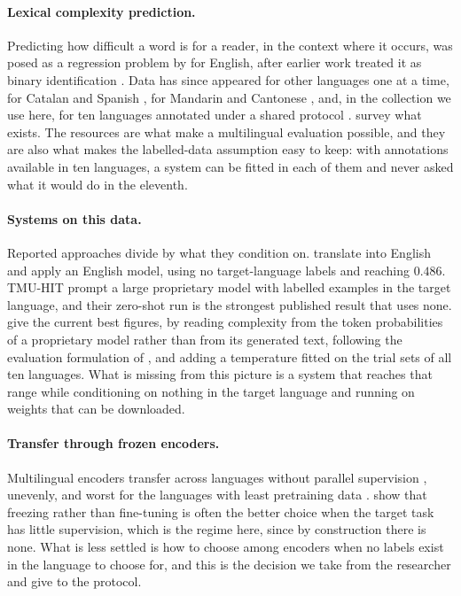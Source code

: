 \paragraph{Lexical complexity prediction.} Predicting how difficult a
word is for a reader, in the context where it occurs, was posed as a
regression problem by \citet{shardlow-etal-2021-semeval} for English,
after earlier work treated it as binary identification
\citep{yimam-etal-2018-report}. Data has since appeared for other
languages one at a time, for Catalan and Spanish
\citep{saggion-etal-2024-lexical}, for Mandarin and Cantonese
\citep{qiu-etal-2024-complex}, and, in the collection we use here, for
ten languages annotated under a shared protocol
\citep{shardlow-etal-2024-bea}. \citet{shardlow-etal-2024-multilingual}
survey what exists. The resources are what make a multilingual
evaluation possible, and they are also what makes the labelled-data
assumption easy to keep: with annotations available in ten languages, a
system can be fitted in each of them and never asked what it would do in
the eleventh.

\paragraph{Systems on this data.} Reported approaches divide by what they
condition on. \citet{cristea-nisioi-2024-machine} translate into English
and apply an English model, using no target-language labels and reaching
$0.486$. TMU-HIT \citep{enomoto-etal-2024-tmu} prompt a large
proprietary model with labelled examples in the target language, and
their zero-shot run is the strongest published result that uses none.
\citet{nohejl-etal-2025-japanese} give the current best figures, by
reading complexity from the token probabilities of a proprietary model
rather than from its generated text, following the evaluation
formulation of \citet{liu-etal-2023-geval}, and adding a temperature
fitted on the trial sets of all ten languages. What is missing from this
picture is a system that reaches that range while conditioning on
nothing in the target language and running on weights that can be
downloaded.

\paragraph{Transfer through frozen encoders.} Multilingual encoders
transfer across languages without parallel supervision
\citep{pires-etal-2019-multilingual, conneau2020xlmr}, unevenly, and
worst for the languages with least pretraining data
\citep{wu-dredze-2020-languages}. \citet{peters-etal-2019-tune} show
that freezing rather than fine-tuning is often the better choice when
the target task has little supervision, which is the regime here, since
by construction there is none. What is less settled is how to choose
among encoders when no labels exist in the language to choose for, and
this is the decision we take from the researcher and give to the
protocol.

